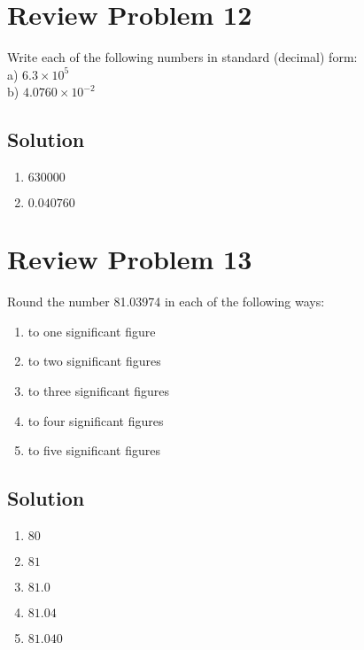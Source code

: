 \documentclass[10pt]{article}
\begin{document}
    \section{Review Problem 12}
        Write each of the following numbers in standard (decimal) form:\\
        a) $6.3 \times 10^5$ \\
        b) $4.0760 \times 10^{-2}$

        \subsection{Solution}
            \begin{enumerate}[label=\alph*)]
                \item $630000$
                \item $0.040760$
            \end{enumerate}

    \pagebreak
    \section{Review Problem 13}
        Round the number 81.03974 in each of the following ways:
        \begin{multicols}{2}
            \begin{enumerate}[label=\alph*)]
                \item   to one significant figure 
                \item   to two significant figures
                \item   to three significant figures 
                \item   to four significant figures
                \item   to five significant figures
            \end{enumerate}
        \end{multicols}

        \subsection{Solution}
            \begin{enumerate}[label=\alph*)]
                \item $80$
                \item $81$
                \item $81.0$
                \item $81.04$
                \item $81.040$
            \end{enumerate}
\end{document}
